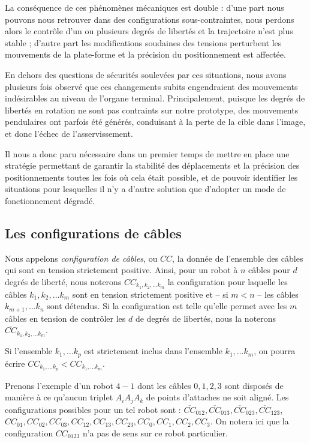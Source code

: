 La cons\'equence de ces ph\'enom\`enes m\'ecaniques est double : d'une part
nous pouvons nous retrouver dans des configurations sous-contraintes, nous
perdons alors le contr\^ole d'un ou plusieurs degr\'es de libert\'es et la
trajectoire n'est plus stable ; d'autre part les modifications soudaines des
tensions perturbent les mouvements de la plate-forme et la pr\'ecision du
positionnement est affect\'ee.

En dehors des questions de s\'ecurit\'es soulev\'ees par ces situations, nous
avons plusieurs fois observ\'e que ces changements subits engendraient des
mouvements ind\'esirables au niveau de l'organe terminal. Principalement,
puisque les degr\'es de libert\'es en rotation ne sont pas contraints sur notre
prototype, des mouvements pendulaires ont parfois \'et\'e g\'en\'er\'es,
conduisant \`a la perte de la cible dans l'image, et donc l'\'echec de
l'asservissement.

Il nous a donc paru n\'ecessaire dans un premier temps de mettre en place une
strat\'egie permettant de garantir la stabilit\'e des d\'eplacements et la
pr\'ecision des positionnements toutes les fois o\`u cela \'etait possible, et
de pouvoir identifier les situations pour lesquelles il n'y a d'autre solution
que d'adopter un mode de fonctionnement d\'egrad\'e.

\subsection{Les configurations de c\^ables}

Nous appelons {\it configuration de c\^ables}, ou $CC$, la donn\'ee de
l'ensemble des c\^ables qui sont en tension strictement positive. Ainsi, pour
un robot \`a $n$ c\^ables pour $d$ degr\'es de libert\'e, nous noterons
$CC_{k_1, k_2, \dots k_m}$ la configuration pour laquelle les c\^ables $k_1,
k_2, \dots k_m$ sont en tension strictement positive et -- si $m < n$ --  les
c\^ables $k_{m+1}, \dots k_n$ sont d\'etendus. Si la configuration est telle
qu'elle permet avec les $m$ c\^ables en tension de contr\^oler les $d$ de
degr\'es de libert\'es, nous la noterons $\overline{CC}_{k_1, k_2, \dots k_m}$.

Si l'ensemble $k_1, \dots k_p$ est strictement inclus dans l'ensemble $k_1,
\dots k_m$, on pourra \'ecrire $CC_{k_1, \dots k_p} < CC_{k_1, \dots
k_m}$.

Prenons l'exemple d'un robot $4-1$ dont les c\^ables $0, 1, 2, 3$ sont
dispos\'es de mani\`ere \`a ce qu'aucun triplet $A_iA_jA_k$ de points d'attaches
ne soit align\'e. Les configurations possibles pour un tel robot sont :
$\overline{CC}_{012}, \overline{CC}_{013}, \overline{CC}_{023},
\overline{CC}_{123}$, $CC_{01}, CC_{02}, CC_{03}, CC_{12}, CC_{13}, CC_{23},
CC_{0}, CC_{1}, CC_{2}, CC_{3}$. On notera ici que la configuration
${CC}_{0123}$ n'a pas de sens sur ce robot particulier.

